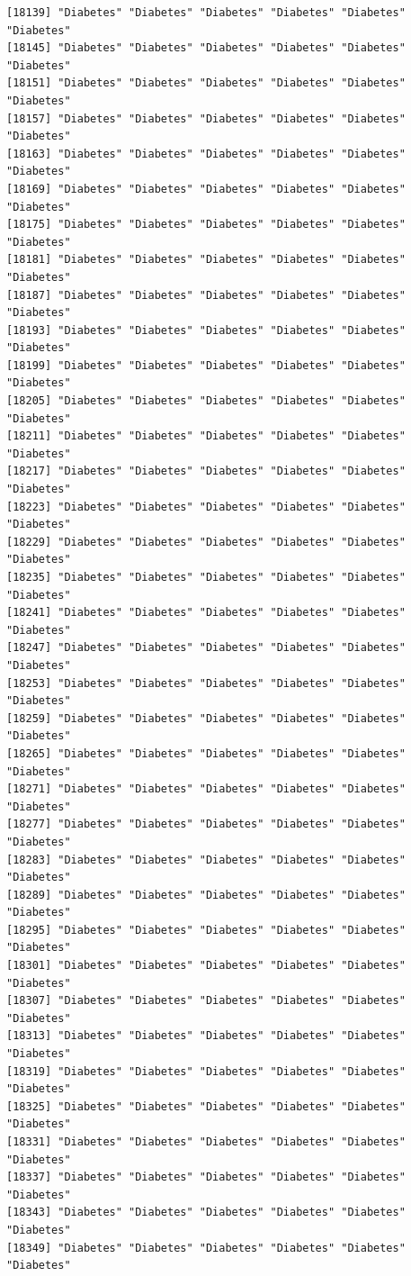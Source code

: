 \documentclass[
  letterpaper,
  DIV=11,
  numbers=noendperiod]{scrartcl}
\begin{document}
\begin{verbatim}
[18139] "Diabetes" "Diabetes" "Diabetes" "Diabetes" "Diabetes" "Diabetes"
[18145] "Diabetes" "Diabetes" "Diabetes" "Diabetes" "Diabetes" "Diabetes"
[18151] "Diabetes" "Diabetes" "Diabetes" "Diabetes" "Diabetes" "Diabetes"
[18157] "Diabetes" "Diabetes" "Diabetes" "Diabetes" "Diabetes" "Diabetes"
[18163] "Diabetes" "Diabetes" "Diabetes" "Diabetes" "Diabetes" "Diabetes"
[18169] "Diabetes" "Diabetes" "Diabetes" "Diabetes" "Diabetes" "Diabetes"
[18175] "Diabetes" "Diabetes" "Diabetes" "Diabetes" "Diabetes" "Diabetes"
[18181] "Diabetes" "Diabetes" "Diabetes" "Diabetes" "Diabetes" "Diabetes"
[18187] "Diabetes" "Diabetes" "Diabetes" "Diabetes" "Diabetes" "Diabetes"
[18193] "Diabetes" "Diabetes" "Diabetes" "Diabetes" "Diabetes" "Diabetes"
[18199] "Diabetes" "Diabetes" "Diabetes" "Diabetes" "Diabetes" "Diabetes"
[18205] "Diabetes" "Diabetes" "Diabetes" "Diabetes" "Diabetes" "Diabetes"
[18211] "Diabetes" "Diabetes" "Diabetes" "Diabetes" "Diabetes" "Diabetes"
[18217] "Diabetes" "Diabetes" "Diabetes" "Diabetes" "Diabetes" "Diabetes"
[18223] "Diabetes" "Diabetes" "Diabetes" "Diabetes" "Diabetes" "Diabetes"
[18229] "Diabetes" "Diabetes" "Diabetes" "Diabetes" "Diabetes" "Diabetes"
[18235] "Diabetes" "Diabetes" "Diabetes" "Diabetes" "Diabetes" "Diabetes"
[18241] "Diabetes" "Diabetes" "Diabetes" "Diabetes" "Diabetes" "Diabetes"
[18247] "Diabetes" "Diabetes" "Diabetes" "Diabetes" "Diabetes" "Diabetes"
[18253] "Diabetes" "Diabetes" "Diabetes" "Diabetes" "Diabetes" "Diabetes"
[18259] "Diabetes" "Diabetes" "Diabetes" "Diabetes" "Diabetes" "Diabetes"
[18265] "Diabetes" "Diabetes" "Diabetes" "Diabetes" "Diabetes" "Diabetes"
[18271] "Diabetes" "Diabetes" "Diabetes" "Diabetes" "Diabetes" "Diabetes"
[18277] "Diabetes" "Diabetes" "Diabetes" "Diabetes" "Diabetes" "Diabetes"
[18283] "Diabetes" "Diabetes" "Diabetes" "Diabetes" "Diabetes" "Diabetes"
[18289] "Diabetes" "Diabetes" "Diabetes" "Diabetes" "Diabetes" "Diabetes"
[18295] "Diabetes" "Diabetes" "Diabetes" "Diabetes" "Diabetes" "Diabetes"
[18301] "Diabetes" "Diabetes" "Diabetes" "Diabetes" "Diabetes" "Diabetes"
[18307] "Diabetes" "Diabetes" "Diabetes" "Diabetes" "Diabetes" "Diabetes"
[18313] "Diabetes" "Diabetes" "Diabetes" "Diabetes" "Diabetes" "Diabetes"
[18319] "Diabetes" "Diabetes" "Diabetes" "Diabetes" "Diabetes" "Diabetes"
[18325] "Diabetes" "Diabetes" "Diabetes" "Diabetes" "Diabetes" "Diabetes"
[18331] "Diabetes" "Diabetes" "Diabetes" "Diabetes" "Diabetes" "Diabetes"
[18337] "Diabetes" "Diabetes" "Diabetes" "Diabetes" "Diabetes" "Diabetes"
[18343] "Diabetes" "Diabetes" "Diabetes" "Diabetes" "Diabetes" "Diabetes"
[18349] "Diabetes" "Diabetes" "Diabetes" "Diabetes" "Diabetes" "Diabetes"

\end{verbatim}
\end{document}
